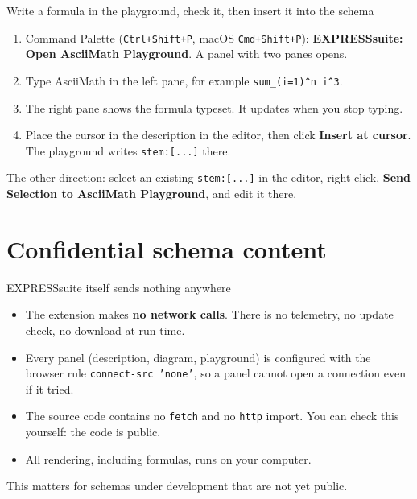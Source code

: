 \documentclass[11pt]{beamer}
\newcommand{\code}[1]{\texttt{#1}}
\begin{document}
\begin{frame}{Write a formula in the playground, check it, then insert it into the schema}
  \centering
  \medskip
  \begin{enumerate}
    \item Command Palette (\code{Ctrl+Shift+P}, macOS \code{Cmd+Shift+P}):
      \textbf{EXPRESSsuite: Open AsciiMath Playground}. A panel with two panes opens.
    \item Type AsciiMath in the left pane, for example \code{sum\_(i=1)\^{}n i\^{}3}.
    \item The right pane shows the formula typeset. It updates when you stop typing.
    \item Place the cursor in the description in the editor, then click
      \textbf{Insert at cursor}. The playground writes \code{stem:[...]} there.
  \end{enumerate}
  \medskip
  \footnotesize\color{sc4grey}
  The other direction: select an existing \code{stem:[...]} in the editor, right-click,
  \textbf{Send Selection to AsciiMath Playground}, and edit it there.
\end{frame}




\section{Confidential schema content}

\begin{frame}{EXPRESSsuite itself sends nothing anywhere}
  \begin{itemize}
    \item The extension makes \textbf{no network calls}. There is no telemetry, no update check,
      no download at run time.
    \item Every panel (description, diagram, playground) is configured with the browser rule
      \code{connect-src 'none'}, so a panel cannot open a connection even if it tried.
    \item The source code contains no \code{fetch} and no \code{http} import. You can check
      this yourself: the code is public.
    \item All rendering, including formulas, runs on your computer.
  \end{itemize}
  \medskip
  This matters for schemas under development that are not yet public.
\end{frame}
\end{document}
